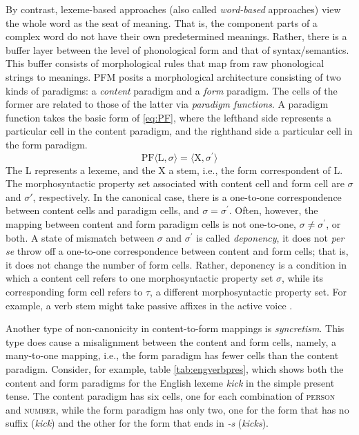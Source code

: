 By contrast, lexeme-based approaches (also called \emph{word-based} 
approaches) view the whole word as the seat of meaning. That is, the component 
parts of a complex word do not have their own predetermined meanings. 
Rather, 
there is a buffer layer between the level of phonological form and that of 
syntax/semantics. This
buffer consists of morphological rules that map from raw phonological 
strings to meanings.
\ac{PFM} \citep{stump:2001} 
posits a morphological architecture consisting of two kinds of paradigms: a \emph{content} paradigm and a \emph{form} paradigm.
The cells of the former are related to those of the latter via
\emph{paradigm functions}.
A paradigm function takes the basic form of
\eqref{eq:PF}, where the lefthand side represents a particular cell in the 
content paradigm, and the righthand side a particular cell in the form paradigm.  
\begin{equation}
\label{eq:PF}
	\text{PF}\langle \text{L},\sigma \rangle = \langle \text{X}, \sigma^\prime \rangle
\end{equation}
The L represents a lexeme, and the X a stem,  i.e., the form correspondent of L. 
The morphosyntactic property set associated with content cell and form cell are $\sigma$ and 
$\sigma\prime$, respectively. In the canonical case, there is a one-to-one
correspondence between content cells and paradigm cells, and 
$\sigma = \sigma^\prime$.
Often, however, the mapping between content and form paradigm cells is 
not one-to-one, $\sigma \ne \sigma^\prime$, or both. A state of mismatch 
between $\sigma$ and 
$\sigma^\prime$ is called \emph{deponency}, it does not \emph{per se} 
throw off a one-to-one correspondence between content and form cells; 
that is, it does not change the number of form cells. Rather, deponency 
is a condition in which a content cell refers to one morphosyntactic property 
set $\sigma$, while its corresponding form cell refers to $\tau$, a different 
morphosyntactic property set. For example, a verb stem might take passive 
affixes in the active voice \citep{stewart-and-stump:2007}.

Another type of non-canonicity in content-to-form mappings is \emph{syncretism}. 
This type does cause a misalignment between the content and form cells, namely,
a many-to-one mapping, i.e., the form paradigm has fewer cells 
than the content paradigm. Consider, for example, table 
\ref{tab:engverbpres}, which shows both the content and form paradigms 
for the English lexeme \emph{kick} in the simple present tense.
The content paradigm has six cells, one for each combination of \textsc{person} 
and \textsc{number}, while the form paradigm has only two, one for the 
form that has no suffix (\textit{kick}) and the other for the form 
that ends in \textit{-s} (\textit{kicks}). 
 
